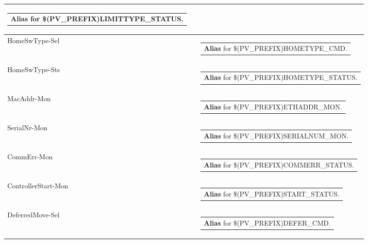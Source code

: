 \documentclass[openany]{article}
\begin{document}
\begin{longtable}{| m{4.5cm} m{2.5cm}  m{8.5cm} |}
\begin{tabular}{@{}m{6cm}@{}}
                \textbf{\color{blue} Alias} for \$(PV\_PREFIX)LIMITTYPE\_STATUS.
            \end{tabular} \hypertarget{pv:home-sw-type}{}\\ \hline
        HomeSwType-Sel &  & \begin{tabular}{@{}m{6cm}@{}}
                \textbf{\color{blue} Alias} for \$(PV\_PREFIX)HOMETYPE\_CMD.
            \end{tabular} \hypertarget{}{}\\ \hline
        HomeSwType-Sts &  & \begin{tabular}{@{}m{6cm}@{}}
                \textbf{\color{blue} Alias} for \$(PV\_PREFIX)HOMETYPE\_STATUS.
            \end{tabular} \hypertarget{pv:mac-addr-mon}{}\\ \hline
        MacAddr-Mon &  & \begin{tabular}{@{}m{6cm}@{}}
                \textbf{\color{blue} Alias} for \$(PV\_PREFIX)ETHADDR\_MON.
            \end{tabular} \hypertarget{pv:serial-nr-mon}{}\\ \hline
        SerialNr-Mon &  & \begin{tabular}{@{}m{6cm}@{}}
                \textbf{\color{blue} Alias} for \$(PV\_PREFIX)SERIALNUM\_MON.
            \end{tabular} \hypertarget{pv:comm-err-mon}{}\\ \hline
        CommErr-Mon &  & \begin{tabular}{@{}m{6cm}@{}}
                \textbf{\color{blue} Alias} for \$(PV\_PREFIX)COMMERR\_STATUS.
            \end{tabular} \hypertarget{pv:controller-start-mon}{}\\ \hline
        ControllerStart-Mon &  & \begin{tabular}{@{}m{6cm}@{}}
                \textbf{\color{blue} Alias} for \$(PV\_PREFIX)START\_STATUS.
            \end{tabular} \hypertarget{pv:deferred-move}{}\\ \hline
        DeferredMove-Sel &  & \begin{tabular}{@{}m{6cm}@{}}
                \textbf{\color{blue} Alias} for \$(PV\_PREFIX)DEFER\_CMD.
            \end{tabular} \hypertarget{}{}\\ \hline

\end{longtable}
\end{document}

